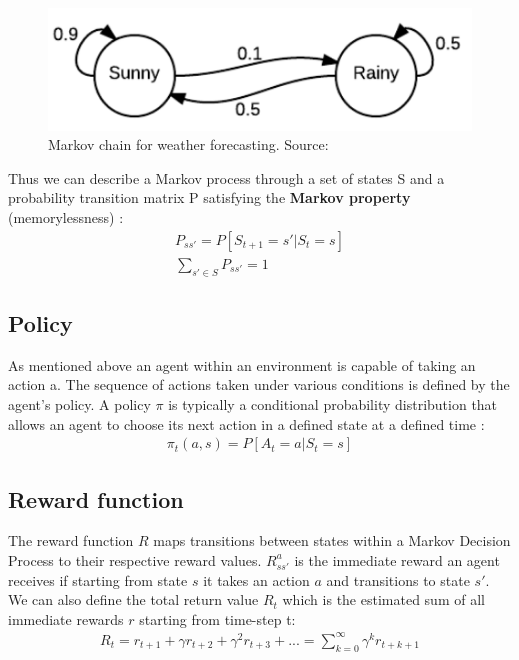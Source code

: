 \begin{figure}[H]
  \centering
  \includegraphics[scale=0.7]{figures/markov_weather.PNG}
  \caption{Markov chain for weather forecasting. Source: \cite{markov_chain_article}}
  \label{fig:weather}
\end{figure}

Thus we can describe a Markov process through a set of states S and a probability transition matrix P satisfying the \textbf{Markov property} (memorylessness) \cite{markov_chain_article}:
\begin{align}
    P_{ss'} = P[S_{t+1} = s' | S_{t} = s]\\
    \sum_{s' \in S} P_{ss'} = 1
\end{align}

\subsection{Policy}
As mentioned above an agent within an environment is capable of taking an action a. The sequence of actions taken under 
various conditions is defined by the agent's policy.
A policy $\pi$ is typically a conditional probability distribution that allows an agent to choose its next action in a defined state at a defined time \cite{lecture_lets_go_markov}:
\begin{align}
    \pi_t(a, s) = P[A_t = a | S_t = s]
\end{align}

\subsection{Reward function}
The reward function $R$ maps transitions between states within a
Markov Decision Process to their respective reward values.
$R_{ss'}^{a}$ is the immediate reward an agent receives if starting from state $s$ it takes an action $a$ and transitions to state $s'$.\\

We can also define the total return value $R_t$ which is the estimated sum of all immediate rewards $r$ starting from time-step t:
\begin{align}
    R_t = r_{t+1} + \gamma r_{t+2} + \gamma ^2 r_{t+3} + ... = \sum^{\infty}_{k=0}\gamma^{k}r_{t+k+1} \label{eq:return}
\end{align}

